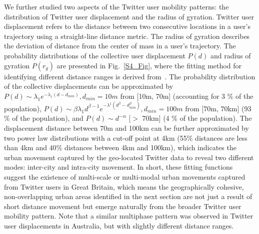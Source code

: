 \documentclass[10pt,letterpaper]{article}
\begin{document}
We further studied two aspects of the Twitter user mobility patterns: the distribution of Twitter user displacement and the radius of gyration. 
Twitter user displacement refers to the distance between two consecutive locations in a user's trajectory using a straight-line distance metric.
The radius of gyration describes the deviation of distance from the center of mass in a user's trajectory.
The probability distributions of the collective user displacement $P(d)$ and radius of gyration $P(r_g)$ are presented in Fig.~\ref{S4_Fig}, where the fitting method for identifying different distance ranges is derived from~\cite{jurdak2015}.
The probability distribution of the collective displacements can be approximated by $P(d) \sim \lambda_{1} e^{-\lambda_{1}(d - d_{min})}, d_{min}=10m$ from [10m, 70m] (accounting for 3 $\%$ of the population),  $ P(d) \sim \beta\lambda_{1}d^{\beta-1}e^{-\lambda^{1}(d^\beta-d_{min}^\beta)}, d_{min} = 100m$ from [70m, 70km] (93 $\%$ of the population), and $P(d) \sim {d}^{-\alpha}$ [$>$ 70km] (4 $\%$ of the population). 
The displacement distance between 70m and 100km can be further approximated by two power law distributions with a cut-off point at 4km (55$\%$ distances are less than 4km and 40$\%$ distances between 4km and 100km), which indicates the urban movement captured by the geo-located Twitter data to reveal two different modes: inter-city and intra-city movement. 
In short, these fitting functions suggest the existence of multi-scale or multi-modal urban movements captured from Twitter users in Great Britain, which means the geographically cohesive, non-overlapping urban areas identified in the next section are not just a result of short distance movement but emerge naturally from the broader Twitter user mobility pattern.
Note that a similar multiphase pattern was observed in Twitter user displacements in Australia, but with slightly different distance ranges\cite{jurdak2015}.
\end{document}
